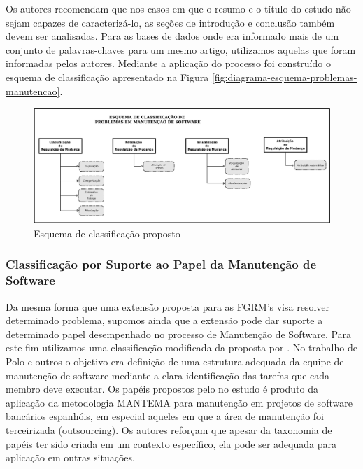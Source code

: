 \documentclass[msc]{ppgccufmg} %
\begin{document}
Os autores recomendam que nos casos em que o resumo e o
título do estudo não sejam capazes de caracterizá-lo, as seções de introdução e
conclusão também devem ser analisadas. Para as bases de dados onde era informado mais de um conjunto
de palavras-chaves para um mesmo artigo, utilizamos aquelas que foram informadas pelos autores. Mediante a aplicação do processo foi
construído o esquema de classificação apresentado na Figura
\ref{fig:diagrama-esquema-problemas-manutencao}.

\begin{figure}[htpb]
	\centering
	\includegraphics[width=0.8\linewidth]{../img/diagrama-esquema-problemas-manutencao.pdf}
	\caption{Esquema de classificação proposto}
	\label{fig:digrama-esquema-problemas-manutencao}
\end{figure}

\subsubsection{Classificação por Suporte ao Papel da Manutenção de Software}
\label{subsubsec:map-esquema-suporte-papel-man}

Da mesma forma que uma extensão proposta para as FGRM's visa resolver determinado
problema, supomos ainda que a extensão pode dar suporte a determinado papel desempenhado no processo
de Manutenção de Software. Para este fim utilizamos uma classificação modificada da proposta
por \cite{Polo1999}. No trabalho de Polo e outros o objetivo era definição de uma estrutura adequada
da equipe de manutenção de software mediante a clara identificação das tarefas que cada membro deve
executar. Os papéis propostos pelo no estudo é produto da aplicação da metodologia MANTEMA\cite{756695} para
manutenção em projetos de software bancários espanhóis, em especial aqueles em que a área de
manutenção foi terceirizada (outsourcing). Os autores reforçam que apesar da taxonomia de papéis ter
sido criada em um contexto específico, ela pode ser adequada para aplicação em outras situações.
\end{document}
